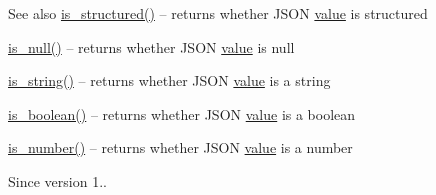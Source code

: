 \begin{DoxySeeAlso}{See also}
\mbox{\hyperlink{classnlohmann_1_1basic__json_a9f68a0af820c3ced7f9d17851ce4c22d}{is\+\_\+structured()}} -- returns whether J\+S\+ON \mbox{\hyperlink{classnlohmann_1_1basic__json_adcf8ca5079f5db993820bf50036bf45d}{value}} is structured 

\mbox{\hyperlink{classnlohmann_1_1basic__json_a8faa039ca82427ed29c486ffd00600c3}{is\+\_\+null()}} -- returns whether J\+S\+ON \mbox{\hyperlink{classnlohmann_1_1basic__json_adcf8ca5079f5db993820bf50036bf45d}{value}} is {\ttfamily null} 

\mbox{\hyperlink{classnlohmann_1_1basic__json_a69b596a4a6683b362095c9a139637396}{is\+\_\+string()}} -- returns whether J\+S\+ON \mbox{\hyperlink{classnlohmann_1_1basic__json_adcf8ca5079f5db993820bf50036bf45d}{value}} is a string 

\mbox{\hyperlink{classnlohmann_1_1basic__json_a943e8cb182d0f2365c76d64b42eaa6fd}{is\+\_\+boolean()}} -- returns whether J\+S\+ON \mbox{\hyperlink{classnlohmann_1_1basic__json_adcf8ca5079f5db993820bf50036bf45d}{value}} is a boolean 

\mbox{\hyperlink{classnlohmann_1_1basic__json_a2b9852390abb4b1ef5fac6984e2fc0f3}{is\+\_\+number()}} -- returns whether J\+S\+ON \mbox{\hyperlink{classnlohmann_1_1basic__json_adcf8ca5079f5db993820bf50036bf45d}{value}} is a number
\end{DoxySeeAlso}
\begin{DoxySince}{Since}
version 1.. 
\end{DoxySince}
\mbox{\label{classnlohmann_1_1basic__json_a69b596a4a6683b362095c9a139637396}} 
